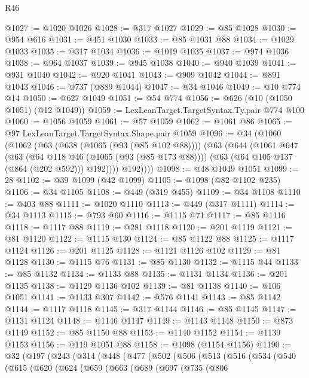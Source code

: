 \begin{lexlean}{R46}
\begin{coremodule}
@1027 := @1020 @1026
@1028 := @317 @1027
@1029 := @85 @1028
@1030 := @954 @616
@1031 := @451 @1030
@1033 := @85 @1031 @88
@1034 := @1029 @1033
@1035 := @317 @1034
@1036 := @1019 @1035
@1037 := @974 @1036
@1038 := @964 @1037
@1039 := @945 @1038
@1040 := @940 @1039
@1041 := @931 @1040
@1042 := @920 @1041
@1043 := @909 @1042
@1044 := @891 @1043
@1046 := @737 (@889 @1044)
@1047 := @34 @1046
@1049 := @10 @774 @14
@1050 := @627 @1049
@1051 := @54 @774
@1056 := @626 (@10 (@1050 @1051) (@12 @1049))
@1059 := LexLeanTarget.TargetSyntax.Ty.pair @774 @100
@1060 := @1056 @1059
@1061 := @57 @1059
@1062 := @1061 @86
@1065 := @97 LexLeanTarget.TargetSyntax.Shape.pair @1059
@1096 := @34
    (@1060
      (@1062
        (@63
          (@638 (@1065 (@93 (@85 @102 @88))))
          (@63
            (@644
              (@1061
                @647
                (@63
                  (@64 @118 @46 (@1065 (@93 (@85 @173 @88))))
                  (@63 (@64 @105 @137 (@864 (@202 @592))) @192))))
            @192))))
@1098 := @48 @1049 @1051
@1099 := 28
@1102 := @39 @1099 (@42 @1099)
@1105 := @1098 (@82 @1102 @235)
@1106 := @34 @1105
@1108 := @449 (@319 @455)
@1109 := @34 @1108
@1110 := @403 @88
@1111 := @1020 @1110
@1113 := @449 (@317 @1111)
@1114 := @34 @1113
@1115 := @793 @60
@1116 := @1115 @71
@1117 := @85 @1116
@1118 := @1117 @88
@1119 := @281 @1118
@1120 := @201 @1119
@1121 := @81 @1120
@1122 := @1115 @130
@1124 := @85 @1122 @88
@1125 := @1117 @1124
@1126 := @201 @1125
@1128 := @1121 @1126 @102
@1129 := @81 @1128
@1130 := @1115 @76
@1131 := @85 @1130
@1132 := @1115 @44
@1133 := @85 @1132
@1134 := @1133 @88
@1135 := @1131 @1134
@1136 := @201 @1135
@1138 := @1129 @1136 @102
@1139 := @81 @1138
@1140 := @106 @1051
@1141 := @1133 @307
@1142 := @576 @1141
@1143 := @85 @1142
@1144 := @1117 @1118
@1145 := @317 @1144
@1146 := @85 @1145
@1147 := @1131 @1124
@1148 := @1146 @1147
@1149 := @1143 @1148
@1150 := @873 @1149
@1152 := @85 @1150 @88
@1153 := @1140 @1152
@1154 := @1139 @1153
@1156 := @119 @1051 @88
@1158 := @1098 (@1154 @1156)
@1190 := @32
    (@197
      (@243
        (@314
          (@448
            (@477
              (@502
                (@506
                  (@513
                    (@516
                      (@534
                        (@540
                          (@615
                            (@620
                              (@624
                                (@659
                                  (@663
                                    (@689
                                      (@697
                                        (@735
                                          (@806

\end{coremodule}
\end{lexlean}
